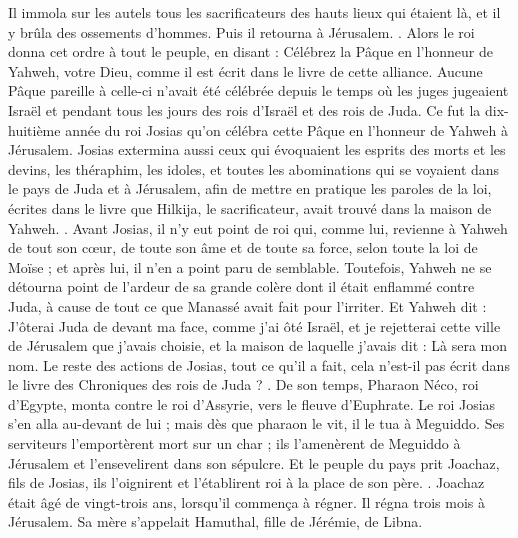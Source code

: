\begin{multicols}{2}
Il immola sur les autels tous les sacrificateurs des hauts lieux qui étaient là, et il y brûla des ossements d'hommes. Puis il retourna à Jérusalem.
.
Alors le roi donna cet ordre à tout le peuple, en disant : Célébrez la Pâque en l'honneur de Yahweh, votre Dieu, comme il est écrit dans le livre de cette alliance.
Aucune Pâque pareille à celle-ci n'avait été célébrée depuis le temps où les juges jugeaient Israël et pendant tous les jours des rois d'Israël et des rois de Juda.
Ce fut la dix-huitième année du roi Josias qu'on célébra cette Pâque en l'honneur de Yahweh à Jérusalem.
Josias extermina aussi ceux qui évoquaient les esprits des morts et les devins, les théraphim, les idoles, et toutes les abominations qui se voyaient dans le pays de Juda et à Jérusalem, afin de mettre en pratique les paroles de la loi, écrites dans le livre que Hilkija, le sacrificateur, avait trouvé dans la maison de Yahweh.
.
Avant Josias, il n'y eut point de roi qui, comme lui, revienne à Yahweh de tout son cœur, de toute son âme et de toute sa force, selon toute la loi de Moïse ; et après lui, il n'en a point paru de semblable.
Toutefois, Yahweh ne se détourna point de l'ardeur de sa grande colère dont il était enflammé contre Juda, à cause de tout ce que Manassé avait fait pour l'irriter.
Et Yahweh dit : J'ôterai Juda de devant ma face, comme j'ai ôté Israël, et je rejetterai cette ville de Jérusalem que j'avais choisie, et la maison de laquelle j'avais dit : Là sera mon nom.
Le reste des actions de Josias, tout ce qu'il a fait, cela n'est-il pas écrit dans le livre des Chroniques des rois de Juda ?
.
De son temps, Pharaon Néco, roi d'Egypte, monta contre le roi d'Assyrie, vers le fleuve d'Euphrate. Le roi Josias s'en alla au-devant de lui ; mais dès que pharaon le vit, il le tua à Meguiddo.
Ses serviteurs l'emportèrent mort sur un char ; ils l'amenèrent de Meguiddo à Jérusalem et l'ensevelirent dans son sépulcre. Et le peuple du pays prit Joachaz, fils de Josias, ils l'oignirent et l'établirent roi à la place de son père.
.
Joachaz était âgé de vingt-trois ans, lorsqu'il commença à régner. Il régna trois mois à Jérusalem. Sa mère s'appelait Hamuthal, fille de Jérémie, de Libna.

\end{multicols}

